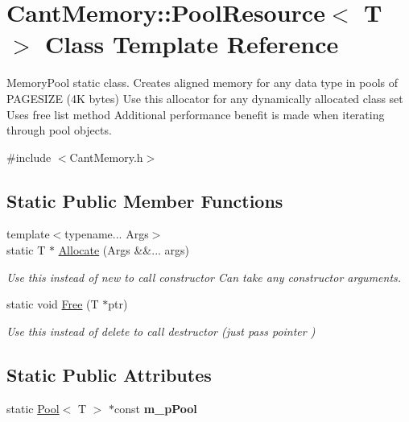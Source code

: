 \hypertarget{classCantMemory_1_1PoolResource}{}\section{Cant\+Memory\+:\+:Pool\+Resource$<$ T $>$ Class Template Reference}
\label{classCantMemory_1_1PoolResource}


Memory\+Pool static class. Creates aligned memory for any data type in pools of P\+A\+G\+E\+S\+I\+ZE (4K bytes) Use this allocator for any dynamically allocated class set Uses free list method Additional performance benefit is made when iterating through pool objects.  




{\ttfamily \#include $<$Cant\+Memory.\+h$>$}

\subsection*{Static Public Member Functions}
\begin{DoxyCompactItemize}
\item 
{\footnotesize template$<$typename... Args$>$ }\\static T $\ast$ \hyperlink{classCantMemory_1_1PoolResource_ad8abdfebe3daa75136204130e49c1fab}{Allocate} (Args \&\&... args)
\begin{DoxyCompactList}\small\item\em Use this instead of new to call constructor Can take any constructor arguments. \end{DoxyCompactList}\item 
static void \hyperlink{classCantMemory_1_1PoolResource_a05b89531f1d82d128d6964899ba94538}{Free} (T $\ast$ptr)
\begin{DoxyCompactList}\small\item\em Use this instead of delete to call destructor (just pass pointer ) \end{DoxyCompactList}\end{DoxyCompactItemize}
\subsection*{Static Public Attributes}
\begin{DoxyCompactItemize}
\item 
\mbox{\label{classCantMemory_1_1PoolResource_a9c7db62e872f870395881f853f5b9ff1}} 
static \hyperlink{structPool}{Pool}$<$ T $>$ $\ast$const {\bfseries m\+\_\+p\+Pool}
\end{DoxyCompactItemize}


